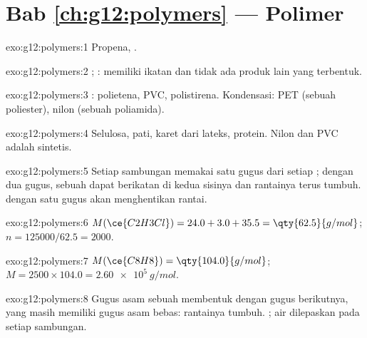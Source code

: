 \section*{Bab \ref{ch:g12:polymers} --- Polimer}

\begin{solution}{exo:g12:polymers:1}
Propena, .
\end{solution}

\begin{solution}{exo:g12:polymers:2}
; :  memiliki ikatan  dan
tidak ada produk lain yang terbentuk.
\end{solution}

\begin{solution}{exo:g12:polymers:3}
: polietena, PVC, polistirena. Kondensasi: PET (sebuah poliester),
nilon (sebuah poliamida).
\end{solution}

\begin{solution}{exo:g12:polymers:4}
Selulosa, pati, karet dari lateks, protein. Nilon dan PVC adalah 
sintetis.
\end{solution}

\begin{solution}{exo:g12:polymers:5}
Setiap sambungan memakai satu gugus dari setiap ; dengan dua
gugus, sebuah  dapat berikatan di kedua sisinya dan rantainya
terus tumbuh.  dengan satu gugus akan menghentikan rantai.
\end{solution}

\begin{solution}{exo:g12:polymers:6}
$M(\ce{C2H3Cl}) = 24.0 + 3.0 + 35.5 = \qty{62.5}{g/mol}$;
$n = 125000/62.5 = 2000$.
\end{solution}

\begin{solution}{exo:g12:polymers:7}
$M(\ce{C8H8}) = \qty{104.0}{g/mol}$; $M = 2500 \times 104.0 =
\qty{2.60e5}{g/mol}$.
\end{solution}

\begin{solution}{exo:g12:polymers:8}
Gugus asam sebuah  membentuk  dengan gugus  
berikutnya, yang masih memiliki gugus asam bebas: rantainya tumbuh.  ; air dilepaskan pada setiap sambungan.
\end{solution}

